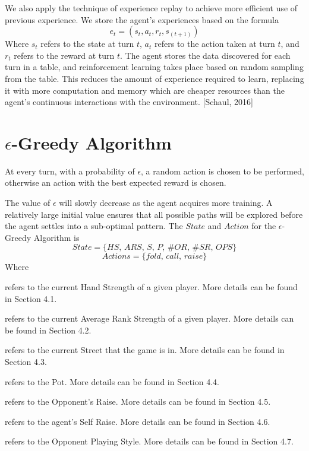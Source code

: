 \documentclass{article}
\begin{document}
We also apply the technique of experience replay to achieve more efficient use of previous experience. We store the agent's experiences based on the formula
\begin{displaymath}
e_t=\left(s_t,a_t,r_t,s_(t+1)\right)
\end{displaymath}
Where $s_t$ refers to the state at turn $t$, $a_t$ refers to the action taken at turn $t$, and $r_t$ refers to the reward at turn $t$.
The agent stores the data discovered for each turn in a table, and reinforcement learning takes place based on random sampling from the table. This reduces the amount of experience required to learn, replacing it with more computation and memory which are cheaper resources than the agent's continuous interactions with the environment. [Schaul, 2016]

\section{$\epsilon$-Greedy Algorithm}

At every turn, with a probability of $\epsilon$, a random action is chosen to be performed, otherwise an action with the best expected reward is chosen.

The value of $\epsilon$ will slowly decrease as the agent acquires more training. A relatively large initial value ensures that all possible paths will be explored before the agent settles into a sub-optimal pattern. The $State$ and $Action$ for the $\epsilon$-Greedy Algorithm is
\begin{displaymath}
State = \{ HS\text{, }ARS\text{, }S\text{, }P\text{, }\#OR\text{, }\#SR\text{, }OPS\}
\end{displaymath}
\begin{displaymath}
Actions = \{ fold\text{, }call\text{, }raise \}
\end{displaymath}
Where

\begin{description}[style=multiline,leftmargin=10mm]
\item [\emph{HS}]refers to the current Hand Strength of a given player. More details can be found in Section 4.1.
\item [\emph{ARS}]refers to the current Average Rank Strength of a given player. More details can be found in Section 4.2.
\item [\emph{S}]refers to the current Street that the game is in. More details can be found in Section 4.3.
\item [\emph{P}]refers to the Pot. More details can be found in Section 4.4.
\item [\emph{\#OR}]refers to the Opponent's Raise. More details can be found in Section 4.5.
\item [\emph{\#SR}]refers to the agent's Self Raise. More details can be found in Section 4.6.
\item [\emph{OPS}]refers to the Opponent Playing Style. More details can be found in Section 4.7.
\end{description}
\end{document}
